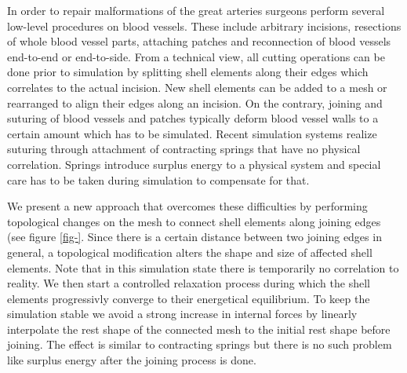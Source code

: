 In order to repair malformations of the great arteries surgeons perform several low-level procedures on blood vessels. These include arbitrary incisions, resections of whole blood vessel parts, attaching patches and reconnection of blood vessels end-to-end or end-to-side. From a technical view, all cutting operations can be done prior to simulation by splitting shell elements along their edges which correlates to the actual incision. New shell elements can be added to a mesh or rearranged to align their edges along an incision. On the contrary, joining and suturing of blood vessels and patches typically deform blood vessel walls to a certain amount which has to be simulated. Recent simulation systems \cite{Sorensen2006,Mosegaard2004,Li2009} realize suturing through attachment of contracting springs that have no physical correlation. Springs introduce surplus energy to a physical system and special care has to be taken during simulation to compensate for that.

We present a new approach that overcomes these difficulties by performing topological changes on the mesh to connect shell elements along joining edges (see figure \ref{fig-}. Since there is a certain distance between two joining edges in general, a topological modification alters the shape and size of affected shell elements. Note that in this simulation state there is temporarily no correlation to reality. We then start a controlled relaxation process during which the shell elements progressivly converge to their energetical equilibrium. To keep the simulation stable we avoid a strong increase in internal forces by linearly interpolate the rest shape of the connected mesh to the initial rest shape before joining. The effect is similar to contracting springs but there is no such problem like surplus energy after the joining process is done.





